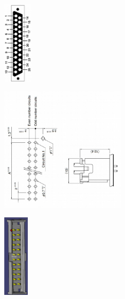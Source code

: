 \documentclass[a4paper,indent]{paper}
\begin{document}
\begin{center}
  \begin{minipage}[b]{0.2\textwidth}
    \centering
    \includegraphics[height=4cm]{img/images-000.png}
  \end{minipage}
  \begin{minipage}[b]{0.5\textwidth}
    \centering
    \includegraphics[height=6cm]{img/images-002.png}
  \end{minipage}
  \begin{minipage}[b]{0.2\textwidth}
    \centering
    \includegraphics[height=4cm]{img/images-004.png}
  \end{minipage}
  \begin{minipage}[t]{0.2\textwidth}
    \centering
  \end{minipage}
  \begin{minipage}[t]{0.5\textwidth}
    \centering
  \end{minipage}
  \begin{minipage}[t]{0.2\textwidth}
    \centering
  \end{minipage}
\end{center}
\end{document}

